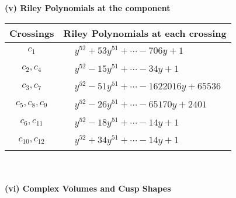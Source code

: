 \documentclass[1p]{elsarticle_modified}
\theoremstyle{definition}
\begin{document}
\newpage\renewcommand{\arraystretch}{1}
\flushleft \textbf{(v) Riley Polynomials at the component}\newline \\
\begin{tabular}{m{50pt}|m{274pt}}
Crossings & \hspace{64pt}Riley Polynomials at each crossing \\
\hline $$\begin{aligned}c_{1}\end{aligned}$$&$\begin{aligned}
&y^{52}+53 y^{51}+\cdots-706 y+1
\end{aligned}$\\
\hline $$\begin{aligned}c_{2},c_{4}\end{aligned}$$&$\begin{aligned}
&y^{52}-15 y^{51}+\cdots-34 y+1
\end{aligned}$\\
\hline $$\begin{aligned}c_{3},c_{7}\end{aligned}$$&$\begin{aligned}
&y^{52}-51 y^{51}+\cdots-1622016 y+65536
\end{aligned}$\\
\hline $$\begin{aligned}c_{5},c_{8},c_{9}\end{aligned}$$&$\begin{aligned}
&y^{52}-26 y^{51}+\cdots-65170 y+2401
\end{aligned}$\\
\hline $$\begin{aligned}c_{6},c_{11}\end{aligned}$$&$\begin{aligned}
&y^{52}-18 y^{51}+\cdots-14 y+1
\end{aligned}$\\
\hline $$\begin{aligned}c_{10},c_{12}\end{aligned}$$&$\begin{aligned}
&y^{52}+34 y^{51}+\cdots-14 y+1
\end{aligned}$\\
\hline
\end{tabular}\\~\\
\newpage\flushleft \textbf{(vi) Complex Volumes and Cusp Shapes}
\end{document}
